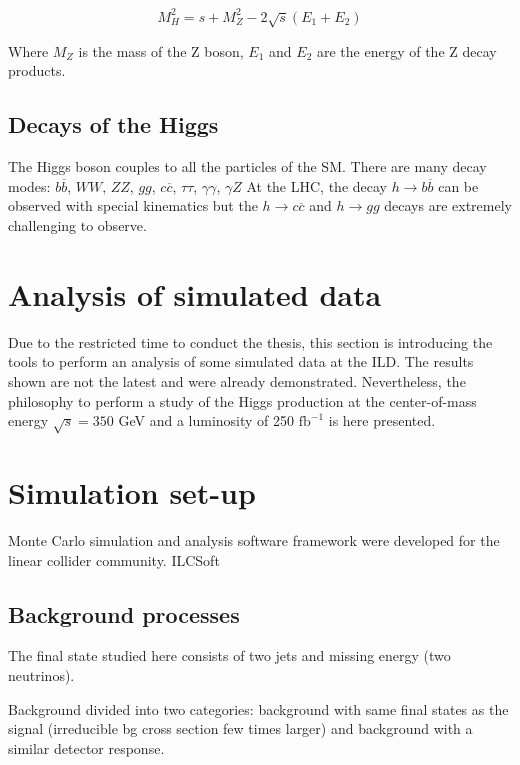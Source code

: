   \begin{equation}
    M^2_H = s + M^2_Z - 2 \sqrt{s}\left(E_{1} + E_{2}\right)
  \end{equation}

  Where $M_Z$ is the mass of the Z boson, $E_1$ and $E_2$ are the energy of the Z decay products. 

  \subsection{Decays of the Higgs}

  The Higgs boson couples to all the particles of the SM.
  There are many decay modes: $b\overline{b}$, $WW$, $ZZ$, $gg$, $c\overline{c}$, $\tau \tau$, $\gamma \gamma$, $\gamma Z$
  At the LHC, the decay $h \rightarrow b\overline{b}$ can be observed with special kinematics but the $h \rightarrow c \overline{c}$ and $h \rightarrow gg$ decays are extremely challenging to observe.

  \section{Analysis of simulated data}
  
    Due to the restricted time to conduct the thesis, this section is introducing the tools to perform an analysis of some simulated data at the ILD. 
    The results shown are not the latest and were already demonstrated. 
    Nevertheless, the philosophy to perform a study of the Higgs production at the center-of-mass energy $\sqrt{s} = 350$ GeV and a luminosity of 250 $\text{fb}^{-1}$ is here presented.
  
  \section{Simulation set-up}  
  
    Monte Carlo simulation and analysis software framework were developed for the linear collider community.
    ILCSoft

  \subsection{Background processes}
  
    The final state studied here consists of two jets and missing energy (two neutrinos). 
    

   Background divided into two categories: background with same final states as the signal (irreducible bg cross section few times larger) and background with a similar detector response.
   
